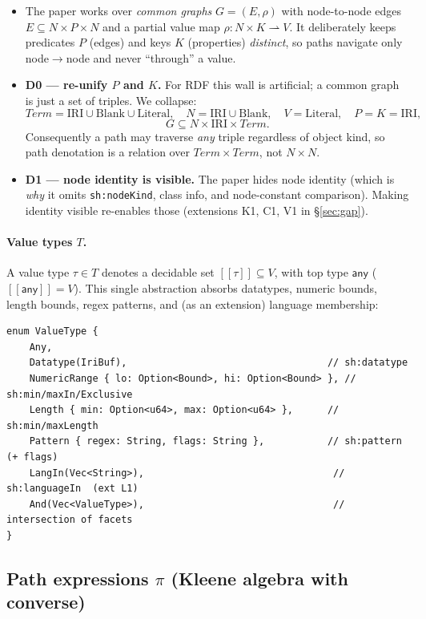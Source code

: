 \documentclass[11pt]{article}
\newcommand{\sem}[1]{[\![#1]\!]}                 %
\newcommand{\Term}{\mathit{Term}}
\newcommand{\Node}{N}
\newcommand{\Val}{V}
\newcommand{\Pred}{P}
\newcommand{\Key}{K}
\newcommand{\code}[1]{\texttt{#1}}
\theoremstyle{definition}
\begin{document}
\begin{itemize}[leftmargin=1.4em]
  \item The paper works over \emph{common graphs} $G=(E,\rho)$ with
  node-to-node edges $E\subseteq \Node\times \Pred\times \Node$ and a partial
  value map $\rho:\Node\times \Key \rightharpoonup \Val$. It deliberately keeps
  predicates $\Pred$ (edges) and keys $\Key$ (properties) \emph{distinct}, so
  paths navigate only node$\to$node and never ``through'' a value.
  \item \textbf{D0 --- re-unify $\Pred$ and $\Key$.} For RDF this wall is
  artificial; a common graph is just a set of triples. We collapse:
  \[
  \Term = \mathrm{IRI}\cup\mathrm{Blank}\cup\mathrm{Literal},\quad
  \Node=\mathrm{IRI}\cup\mathrm{Blank},\quad
  \Val=\mathrm{Literal},\quad
  \Pred=\Key=\mathrm{IRI},
  \]
  \[
  G\subseteq \Node\times\mathrm{IRI}\times\Term.
  \]
  Consequently a path may traverse \emph{any} triple regardless of object kind,
  so path denotation is a relation over $\Term\times\Term$, not $\Node\times\Node$.
  \item \textbf{D1 --- node identity is visible.} The paper hides node identity
  (which is \emph{why} it omits \code{sh:nodeKind}, class info, and node-constant
  comparison). Making identity visible re-enables those (extensions K1, C1, V1
  in \S\ref{sec:gap}).
\end{itemize}

\paragraph{Value types $T$.} A value type $\tau\in T$ denotes a decidable set
$\sem{\tau}\subseteq \Val$, with top type $\mathsf{any}$
($\sem{\mathsf{any}}=\Val$). This single abstraction absorbs datatypes, numeric
bounds, length bounds, regex patterns, and (as an extension) language membership:
\begin{lstlisting}
enum ValueType {
    Any,
    Datatype(IriBuf),                                   // sh:datatype
    NumericRange { lo: Option<Bound>, hi: Option<Bound> }, // sh:min/maxIn/Exclusive
    Length { min: Option<u64>, max: Option<u64> },      // sh:min/maxLength
    Pattern { regex: String, flags: String },           // sh:pattern (+ flags)
    LangIn(Vec<String>),                                 // sh:languageIn  (ext L1)
    And(Vec<ValueType>),                                 // intersection of facets
}
\end{lstlisting}

\subsection{Path expressions $\pi$ (Kleene algebra with converse)}
\end{document}
